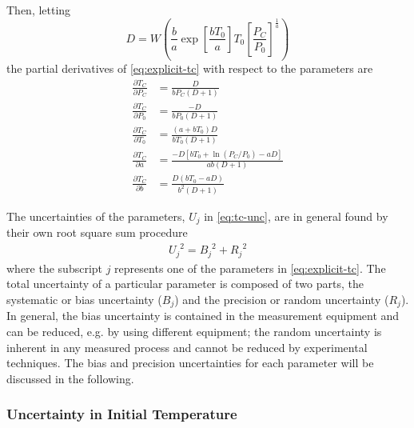 \documentclass[12pt, letterpaper]{article}
\begin{document}
Then, letting
%
\begin{equation*}
D = W\!\left(\frac{b}{a} \exp\!{\left[\frac{b T_0}{a}\right]} T_0 \left[\frac{P_C}{P_0}\right]^{\frac{1}{a}}\right)
\end{equation*}
%
the partial derivatives of \autoref{eq:explicit-tc} with respect to the parameters are
%
\begin{subequations}
\begin{align}
\frac{\partial T_C}{\partial P_C} &= \frac{D}{b P_C \left(D + 1\right)} \\
\frac{\partial T_C}{\partial P_0} &= \frac{-D}{b P_0 \left(D + 1\right)} \\
\frac{\partial T_C}{\partial T_0} &= \frac{\left(a + b T_0\right) D}{b T_0 \left(D + 1\right)} \\
\frac{\partial T_C}{\partial a} &= \frac{-D \left[b T_0 + \ln{\left(P_C/P_0\right)} - a D\right]}{a b \left(D + 1\right)} \\
\frac{\partial T_C}{\partial b} &= \frac{D\left(b T_0 - a D\right)}{{b}^2\left(D + 1\right)}
\end{align}
\end{subequations}

The uncertainties of the parameters, $U_j$ in \autoref{eq:tc-unc}, are in
general found by their own root square sum procedure
%
\begin{align}
{U_j}^2 = {B_j}^2 + {R_j}^2
\end{align}
%
where the subscript $j$ represents one of the parameters in \autoref{eq:explicit-tc}.
The total uncertainty of a particular parameter is composed of
two parts, the systematic or bias uncertainty ($B_j$) and the
precision or random uncertainty ($R_j$). In general, the bias
uncertainty is contained in the measurement equipment and can
be reduced, e.g. by using different equipment; the random uncertainty
is inherent in any measured process and cannot be reduced by
experimental techniques. The bias and precision uncertainties
for each parameter will be discussed in the following.

\subsubsection{Uncertainty in Initial Temperature}
\end{document}
